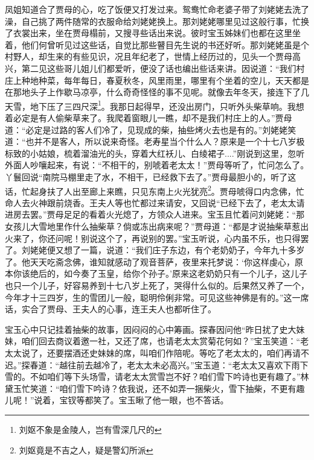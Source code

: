 \documentclass[12pt,oneside]{book}
\begin{document}
凤姐知道合了贾母的心，吃了饭便又打发过来。鸳鸯忙命老婆子带了刘姥姥去洗了澡，自己挑了两件随常的衣服命给刘姥姥换上。那刘姥姥哪里见过这般行事，忙换了衣裳出来，坐在贾母榻前，又搜寻些话出来说。彼时宝玉姊妹们也都在这里坐着，他们何曾听见过这些话，自觉比那些瞽目先生说的书还好听。那刘姥姥虽是个村野人，却生来的有些见识，况且年纪老了，世情上经历过的，见头一个贾母高兴，第二见这些哥儿姐儿们都爱听，便没了话也编出些话来讲。因说道：“我们村庄上种地种菜，每年每日，春夏秋冬，风里雨里，哪里有个坐着的空儿，天天都是在那地头子上作歇马凉亭，什么奇奇怪怪的事不见呢。就像去年冬天，接连下了几天雪，地下压了三四尺深\footnote{刘妪不象是金陵人，岂有雪深几尺的}。我那日起得早，还没出房门，只听外头柴草响。我想着必定是有人偷柴草来了。我爬着窗眼儿一瞧，却不是我们村庄上的人。”贾母道：“必定是过路的客人们冷了，见现成的柴，抽些烤火去也是有的。”刘姥姥笑道：“也并不是客人，所以说来奇怪。老寿星当个什么人？原来是一个十七八岁极标致的小姑娘，梳着溜油光的头，穿着大红袄儿、白绫裙子....”刚说到这里，忽听外面人吵嚷起来，有说：“不相干的，别唬着老太太！”贾母等听了，忙问怎么了。丫鬟回说“南院马棚里走了水，不相干，已经救下去了。”贾母最胆小的，听了这话，忙起身扶了人出至廊上来瞧，只见东南上火光犹亮\footnote{刘妪竟是不吉之人，疑是警幻所派}。贾母唬得口内念佛，忙命人去火神跟前烧香。王夫人等也忙都过来请安，又回说“已经下去了，老太太请进房去罢。”贾母足足的看着火光熄了，方领众人进来。宝玉且忙着问刘姥姥：“那女孩儿大雪地里作什么抽柴草？倘或冻出病来呢？”贾母道：“都是才说抽柴草惹出火来了，你还问呢！别说这个了，再说别的罢。”宝玉听说，心内虽不乐，也只得罢了。刘姥姥便又想了一篇，说道：“我们庄子东边，有个老奶奶子，今年九十多岁了。他天天吃斋念佛，谁知就感动了观音菩萨，夜里来托梦说：‘你这样虔心，原本你该绝后的，如今奏了玉皇，给你个孙子。’原来这老奶奶只有一个儿子，这儿子也只一个儿子，好容易养到十七八岁上死了，哭得什么似的。后果然又养了一个，今年才十三四岁，生的雪团儿一般，聪明伶俐非常。可见这些神佛是有的。”这一席话，实合了贾母、王夫人的心事，连王夫人也都听住了。

宝玉心中只记挂着抽柴的故事，因闷闷的心中筹画。探春因问他“昨日扰了史大妹妹，咱们回去商议着邀一社，又还了席，也请老太太赏菊花何如？”宝玉笑道：“老太太说了，还要摆酒还史妹妹的席，叫咱们作陪呢。等吃了老太太的，咱们再请不迟。”探春道：“越往前去越冷了，老太太未必高兴。”宝玉道：“老太太又喜欢下雨下雪的。不如咱们等下头场雪，请老太太赏雪岂不好？咱们雪下吟诗也更有趣了。”林黛玉忙笑道：“咱们雪下吟诗？依我说，还不如弄一捆柴火，雪下抽柴，不更有趣儿呢！”说着，宝钗等都笑了。宝玉瞅了他一眼，也不答话。
\end{document}
